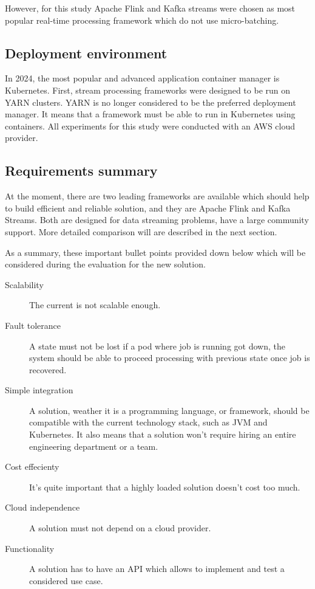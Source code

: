 However, for this study Apache Flink and Kafka streams were chosen as most popular real-time processing
framework which do not use micro-batching.

\subsection{Deployment environment}\label{subsec:deployment-environment}
In 2024, the most popular and advanced application container manager is Kubernetes.
First, stream processing frameworks were designed to be run on YARN clusters.
YARN is no longer considered to be the preferred deployment manager.
It means that a framework must be able to run in Kubernetes using containers.
All experiments for this study were conducted with an AWS cloud provider.


\subsection{Requirements summary}\label{subsec:final-requirements}
At the moment, there are two leading frameworks are available which
should help to build efficient and reliable solution, and
they are Apache Flink and Kafka Streams.
Both are designed for data streaming problems, have a large community support.
More detailed comparison will are described in the next section.

As a summary, these important bullet points provided down below which will
be considered during the evaluation for the new solution.

\begin{description}
    \item[Scalability] The current is not scalable enough.
    \item[Fault tolerance] A state must not be lost if a pod where job is running got down,
    the system should be able to proceed processing with previous state once job is recovered.
    \item[Simple integration] A solution, weather it is a programming language,
    or framework, should be compatible with the current technology stack, such as JVM and Kubernetes.
    It also means that a solution won't require hiring an entire engineering department or a team.
    \item[Cost effecienty] It's quite important that a highly loaded solution doesn't cost too much.
    \item[Cloud independence] A solution must not depend on a cloud provider.
    \item[Functionality] A solution has to have an API which allows to implement and test a considered use case.
\end{description}


